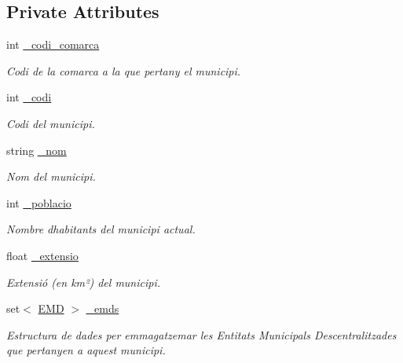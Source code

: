 \subsection*{Private Attributes}
\begin{DoxyCompactItemize}
\item 
\mbox{\label{classMunicipi_af2489acba358baf4e1655ddd96ea0eef}} 
int \hyperlink{classMunicipi_af2489acba358baf4e1655ddd96ea0eef}{\+\_\+codi\+\_\+comarca}
\begin{DoxyCompactList}\small\item\em Codi de la comarca a la que pertany el municipi. \end{DoxyCompactList}\item 
\mbox{\label{classMunicipi_a2f8941e9664a1759d68ae56074f880da}} 
int \hyperlink{classMunicipi_a2f8941e9664a1759d68ae56074f880da}{\+\_\+codi}
\begin{DoxyCompactList}\small\item\em Codi del municipi. \end{DoxyCompactList}\item 
\mbox{\label{classMunicipi_a3ef4800192fabda4d692b74c367e0ee1}} 
string \hyperlink{classMunicipi_a3ef4800192fabda4d692b74c367e0ee1}{\+\_\+nom}
\begin{DoxyCompactList}\small\item\em Nom del municipi. \end{DoxyCompactList}\item 
\mbox{\label{classMunicipi_a4fa60e01e9357f2db897b9266b5766df}} 
int \hyperlink{classMunicipi_a4fa60e01e9357f2db897b9266b5766df}{\+\_\+poblacio}
\begin{DoxyCompactList}\small\item\em Nombre d\textquotesingle{}habitants del municipi actual. \end{DoxyCompactList}\item 
\mbox{\label{classMunicipi_a7a6ae8deb5e8658a7a87ae1ecd47cf0a}} 
float \hyperlink{classMunicipi_a7a6ae8deb5e8658a7a87ae1ecd47cf0a}{\+\_\+extensio}
\begin{DoxyCompactList}\small\item\em Extensió (en km²) del municipi. \end{DoxyCompactList}\item 
\mbox{\label{classMunicipi_a7a35c9aa8d6948fe019b445d1e3bd00b}} 
set$<$ \hyperlink{classEMD}{E\+MD} $>$ \hyperlink{classMunicipi_a7a35c9aa8d6948fe019b445d1e3bd00b}{\+\_\+emds}
\begin{DoxyCompactList}\small\item\em Estructura de dades per emmagatzemar les Entitats Municipals Descentralitzades que pertanyen a aquest municipi. \end{DoxyCompactList}\end{DoxyCompactItemize}
